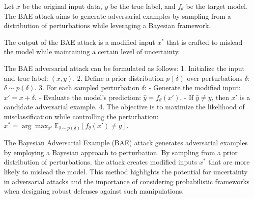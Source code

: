 Let \( x \) be the original input data, \( y \) be the true label, and \( f_{\theta} \) be the target model. The BAE attack aims to generate adversarial examples by sampling from a distribution of perturbations while leveraging a Bayesian framework.

The output of the BAE attack is a modified input \( x^* \) that is crafted to mislead the model while maintaining a certain level of uncertainty.

The BAE adversarial attack can be formulated as follows:
1. Initialize the input and true label:
   $
   (x, y).
   $
2. Define a prior distribution \( p(\delta) \) over perturbations \( \delta \):
   $
   \delta \sim p(\delta).
   $
3. For each sampled perturbation \( \delta \):
   - Generate the modified input:
   $
   x' = x + \delta.
   $
   - Evaluate the model's prediction:
   $
   \hat{y} = f_{\theta}(x').
   $
   - If \( \hat{y} \neq y \), then \( x' \) is a candidate adversarial example.
4. The objective is to maximize the likelihood of misclassification while controlling the perturbation:
   $
   x^* = \arg\max_{x'} \mathbb{E}_{\delta \sim p(\delta)} [f_{\theta}(x') \neq y].
   $

The Bayesian Adversarial Example (BAE) attack generates adversarial examples by employing a Bayesian approach to perturbation. By sampling from a prior distribution of perturbations, the attack creates modified inputs \( x^* \) that are more likely to mislead the model. This method highlights the potential for uncertainty in adversarial attacks and the importance of considering probabilistic frameworks when designing robust defenses against such manipulations.
